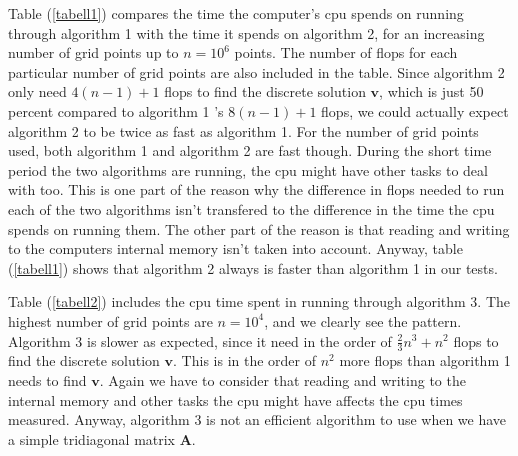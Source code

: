 \documentclass[11pt]{article}
\begin{document}
\noindent
Table (\ref{tabell1}) compares the time the computer's cpu spends on running through algorithm 1 with 
the time it spends on algorithm 2, for an increasing number
of grid points up to $n = 10^6$ points. The number of flops for each particular number of grid points
are also included in the table. Since algorithm 2  only need $4(n-1) + 1$ flops to find 
the discrete solution $\mathbf v$, which is just 50 percent compared to algorithm 1 's 
$8(n-1) + 1$ flops, we could actually
expect algorithm 2 to be twice as fast as algorithm 1. For the number of grid points used, 
both algorithm 1 and algorithm 2 are fast though. 
During the short time period the two algorithms are running, the cpu might
have other tasks to deal with too. This is one part of the reason why the difference in flops needed to 
run each of the
two algorithms isn't transfered to the difference in the time the cpu spends
on running them. The other part of the reason is that reading and writing to the computers internal
memory isn't taken into account. Anyway, table (\ref{tabell1}) shows that algorithm 2 always is faster than
algorithm 1 in our tests.

\vspace{4mm}
\noindent
Table (\ref{tabell2}) includes the cpu time spent in running through algorithm 3. 
The highest number of grid points are $n = 10^4$, and we clearly
see the pattern. Algorithm 3 is slower as expected, since it need in the order of 
$\frac{2}{3}n^3 + n^2$ flops to find the discrete solution $\mathbf v$. This is in the order of $n^2$ 
more flops than algorithm 1 needs to find $\mathbf v$. Again we have to consider that
reading and writing to the internal memory and other tasks the cpu might have affects the cpu times
measured.
Anyway, algorithm 3 is not an efficient algorithm to use when
we have a simple tridiagonal matrix $\mathbf A$.
\end{document}
